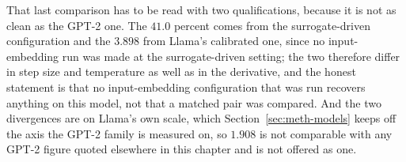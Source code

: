That last comparison has to be read with two qualifications, because it is not as clean as the GPT-2 one. The $41.0$ percent comes from the surrogate-driven configuration and the $3.898$ from Llama's calibrated one, since no input-embedding run was made at the surrogate-driven setting; the two therefore differ in step size and temperature as well as in the derivative, and the honest statement is that no input-embedding configuration that was run recovers anything on this model, not that a matched pair was compared. And the two divergences are on Llama's own scale, which Section~\ref{sec:meth-models} keeps off the axis the GPT-2 family is measured on, so $1.908$ is not comparable with any GPT-2 figure quoted elsewhere in this chapter and is not offered as one.

